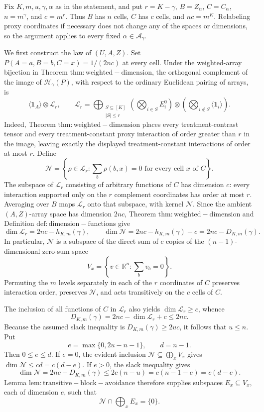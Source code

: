Fix \(K,m,u,\gamma,\alpha\) as in the statement, and put \(r=K-\gamma\), \(B=Z_\alpha\), \(C=C_\alpha\), \(n=m^\gamma\), and \(c=m^r\). Thus \(B\) has \(n\) cells, \(C\) has \(c\) cells, and \(nc=m^K\). Relabeling proxy coordinates if necessary does not change any of the spaces or dimensions, so the argument applies to every fixed \(\alpha\in\mathcal A_\gamma\).

We first construct the law of \((U,A,Z)\). Set \(P(A=a,B=b,C=x)=1/(2nc)\) at every cell. Under the weighted-array bijection in Theorem \(\mathrm{thm:weighted-dimension}\), the orthogonal complement of the image of \(\mathcal H_\gamma(P)\), with respect to the ordinary Euclidean pairing of arrays, is
\[
\langle\mathbf 1_A\rangle\otimes\mathcal L_r,\qquad\mathcal L_r=\bigoplus_{\substack{S\subseteq[K]\\ |S|\le r}}\left(\bigotimes_{i\in S}E_i^0\right)\otimes\left(\bigotimes_{i\notin S}\langle\mathbf 1_i\rangle\right).
\]
Indeed, Theorem \(\mathrm{thm:weighted-dimension}\) places every treatment-contrast tensor and every treatment-constant proxy interaction of order greater than \(r\) in the image, leaving exactly the displayed treatment-constant interactions of order at most \(r\). Define
\[
\mathcal N=\left\{\rho\in\mathcal L_r:\sum_b\rho(b,x)=0\text{ for every cell }x\text{ of }C\right\}.
\]
The subspace of \(\mathcal L_r\) consisting of arbitrary functions of \(C\) has dimension \(c\): every interaction supported only on the \(r\) complement coordinates has order at most \(r\). Averaging over \(B\) maps \(\mathcal L_r\) onto that subspace, with kernel \(\mathcal N\). Since the ambient \((A,Z)\)-array space has dimension \(2nc\), Theorem \(\mathrm{thm:weighted-dimension}\) and Definition \(\mathrm{def:dimension-functions}\) give
\[
\dim\mathcal L_r=2nc-h_{K,m}(\gamma),\qquad \dim\mathcal N=2nc-h_{K,m}(\gamma)-c=2nc-D_{K,m}(\gamma).
\]
In particular, \(\mathcal N\) is a subspace of the direct sum of \(c\) copies of the \((n-1)\)-dimensional zero-sum space
\[
V_x=\left\{v\in\mathbb R^n:\sum_bv_b=0\right\}.
\]
Permuting the \(m\) levels separately in each of the \(r\) coordinates of \(C\) preserves interaction order, preserves \(\mathcal N\), and acts transitively on the \(c\) cells of \(C\).

The inclusion of all functions of \(C\) in \(\mathcal L_r\) also yields \(\dim\mathcal L_r\ge c\), whence
\[
D_{K,m}(\gamma)=2nc-\dim\mathcal L_r+c\le2nc.
\]
Because the assumed slack inequality is \(D_{K,m}(\gamma)\ge2uc\), it follows that \(u\le n\). Put
\[
e=\max\{0,2u-n-1\},\qquad d=n-1.
\]
Then \(0\le e\le d\). If \(e=0\), the evident inclusion \(\mathcal N\subseteq\bigoplus_xV_x\) gives \(\dim\mathcal N\le cd=c(d-e)\). If \(e>0\), the slack inequality gives
\[
\dim\mathcal N=2nc-D_{K,m}(\gamma)\le2c(n-u)=c(n-1-e)=c(d-e).
\]
Lemma \(\mathrm{lem:transitive-block-avoidance}\) therefore supplies subspaces \(E_x\subseteq V_x\), each of dimension \(e\), such that
\[
\mathcal N\cap\bigoplus_xE_x=\{0\}.
\]

